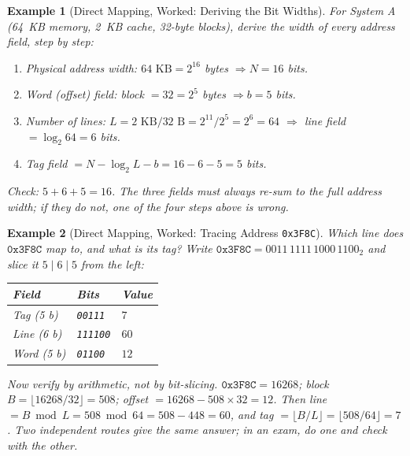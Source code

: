 \documentclass[11pt]{article}
\newtheorem{example}{Example}[section]
\begin{document}
\begin{example}[Direct Mapping, Worked: Deriving the Bit Widths]
\label{ex:direct-widths}
For System A (64~KB memory, 2~KB cache, 32-byte blocks), derive the width of every address field, step by step:

\begin{enumerate}
  \item Physical address width: $64\text{ KB} = 2^{16}$ bytes $\Rightarrow N = 16$ bits.
  \item Word (offset) field: block $= 32 = 2^{5}$ bytes $\Rightarrow b = 5$ bits.
  \item Number of lines: $L = 2\text{ KB} / 32\text{ B} = 2^{11}/2^{5} = 2^{6} = 64$ $\Rightarrow$ line field $= \log_2 64 = 6$ bits.
  \item Tag field $= N - \log_2 L - b = 16 - 6 - 5 = 5$ bits.
\end{enumerate}

Check: $5 + 6 + 5 = 16$. The three fields must always re-sum to the full address width; if they do not, one of the four steps above is wrong.
\end{example}

\begin{example}[Direct Mapping, Worked: Tracing Address \texttt{0x3F8C}]
\label{ex:direct-trace}
Which line does $\texttt{0x3F8C}$ map to, and what is its tag? Write $\texttt{0x3F8C} = 0011\,1111\,1000\,1100_2$ and slice it $5 \mid 6 \mid 5$ from the left:

\begin{center}
\begin{tabular}{@{}lll@{}}
  \toprule
  \textbf{Field} & \textbf{Bits} & \textbf{Value} \\
  \midrule
  Tag (5 b)  & \texttt{00111}  & $7$  \\
  Line (6 b) & \texttt{111100} & $60$ \\
  Word (5 b) & \texttt{01100}  & $12$ \\
  \bottomrule
\end{tabular}
\end{center}

Now verify by arithmetic, not by bit-slicing. $\texttt{0x3F8C} = 16268$; block $B = \lfloor 16268/32 \rfloor = 508$; offset $= 16268 - 508 \times 32 = 12$. Then line $= B \bmod L = 508 \bmod 64 = 508 - 448 = 60$, and tag $= \lfloor B/L \rfloor = \lfloor 508/64 \rfloor = 7$. Two independent routes give the same answer; in an exam, do one and check with the other.
\end{example}
\end{document}
